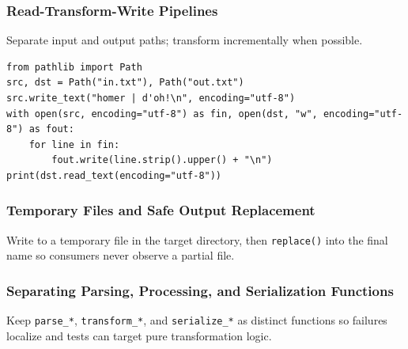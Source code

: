 \documentclass[a4paper,twoside]{report}
\begin{document}
\subsubsection{Read-Transform-Write Pipelines}

Separate input and output paths; transform incrementally when possible.

\begin{verbatim}
from pathlib import Path
src, dst = Path("in.txt"), Path("out.txt")
src.write_text("homer | d'oh!\n", encoding="utf-8")
with open(src, encoding="utf-8") as fin, open(dst, "w", encoding="utf-8") as fout:
    for line in fin:
        fout.write(line.strip().upper() + "\n")
print(dst.read_text(encoding="utf-8"))
\end{verbatim}

\subsubsection{Temporary Files and Safe Output Replacement}

Write to a temporary file in the target directory, then \texttt{replace()} into the final name so consumers never observe a partial file.

\subsubsection{Separating Parsing, Processing, and Serialization Functions}

Keep \texttt{parse\_*}, \texttt{transform\_*}, and \texttt{serialize\_*} as distinct functions so failures localize and tests can target pure transformation logic.



\listoffigures


\end{document}
